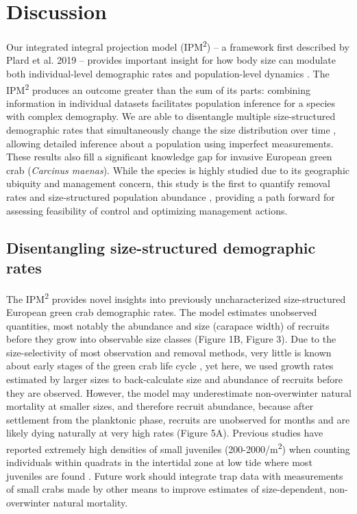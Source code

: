 \documentclass{article}
\begin{document}
\section{Discussion}

Our integrated integral projection model (IPM\textsuperscript{2}) – a framework first described by Plard et al. 2019 – provides important insight for how body size can modulate both individual-level demographic rates and population-level dynamics \parencite{plard2019ipm}. The IPM\textsuperscript{2} produces an outcome greater than the sum of its parts: combining information in individual datasets facilitates population inference for a species with complex demography. We are able to disentangle multiple size-structured demographic rates that simultaneously change the size distribution over time \parencite{sogard1997size, carlson2010bayesian}, allowing detailed inference about a population using imperfect measurements. These results also fill a significant knowledge gap for invasive European green crab (\textit{Carcinus maenas}). While the species is highly studied due to its geographic ubiquity and management concern, this study is the first to quantify removal rates and size-structured population abundance \parencite{young2019life}, providing a path forward for assessing feasibility of control and optimizing management actions.

\subsection{Disentangling size-structured demographic rates}

The IPM\textsuperscript{2} provides novel insights into previously uncharacterized size-structured European green crab demographic rates. The model estimates unobserved quantities, most notably the abundance and size (carapace width) of recruits before they grow into observable size classes (Figure 1B, Figure 3). Due to the size-selectivity of most observation and removal methods, very little is known about early stages of the green crab life cycle \parencite{yamada2005growth}, yet here, we used growth rates estimated by larger sizes to back-calculate size and abundance of recruits before they are observed. However, the model may underestimate non-overwinter natural mortality at smaller sizes, and therefore recruit abundance, because after settlement from the planktonic phase, recruits are unobserved for months and are likely dying naturally at very high rates (Figure 5A). Previous studies have reported extremely high densities of small juveniles (200-2000/m\textsuperscript{2}) when counting individuals within quadrats in the intertidal zone at low tide where most juveniles are found \parencite{breteler1976settlement, thiel1994recruitment}. Future work should integrate trap data with measurements of small crabs made by other means to improve estimates of size-dependent, non-overwinter natural mortality.
\end{document}
